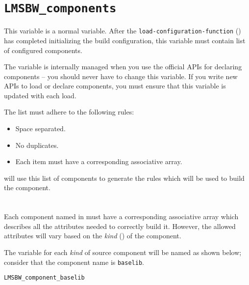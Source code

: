 \section{\texttt{LMSBW\_components}}\label{variables:lmsbw-components}

This variable is a normal \make variable.  After the
\texttt{load-configuration-function}
() has completed
initializing the build configuration, this variable must contain list
of configured components.

The variable is internally managed when you use the official APIs for
declaring components -- you should never have to change this variable.
If you write new APIs to load or declare components, you must ensure
that this variable is updated with each load.

The list must adhere to the following rules:

\begin{itemize}
\item Space separated.
\item No duplicates.
\item Each item must have a corresponding 
  associative array.
\end{itemize}

\lmsbw will use this list of components to generate the rules which
will be used to build the component.

\section{}

Each component named in \lmsbwcomponents must have a corresponding
associative array which describes all the attributes needed to
correctly build it.  However, the allowed attributes will vary based
on the \emph{kind} () of the component.

The \make variable for each \emph{kind} of source component will be
named as shown below; consider that the component name is \texttt{baselib}.

\begin{verbatim}
LMSBW_component_baselib
\end{verbatim}

